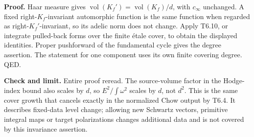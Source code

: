 \textbf{Proof.} Haar measure gives \(\operatorname{vol}(K_f')=\operatorname{vol}(K_f)/d\), with \(c_\infty\) unchanged. A fixed right-\(K_f\)-invariant automorphic function is the same function when regarded as right-\(K_f'\)-invariant, so its adelic norm does not change. Apply T6.10, or integrate pulled-back forms over the finite étale cover, to obtain the displayed identities. Proper pushforward of the fundamental cycle gives the degree assertion. The statement for one component uses its own finite covering degree. QED.

\textbf{Check and limit.} Entire proof reread. The source-volume factor in the Hodge-index bound also scales by \(d\), so \(E^2/\int\omega^2\) scales by \(d\), not \(d^2\). This is the same cover growth that cancels exactly in the normalized Chow output by T6.4. It describes fixed-data level change; allowing new Schwartz vectors, primitive integral maps or target polarizations changes additional data and is not covered by this invariance assertion.
